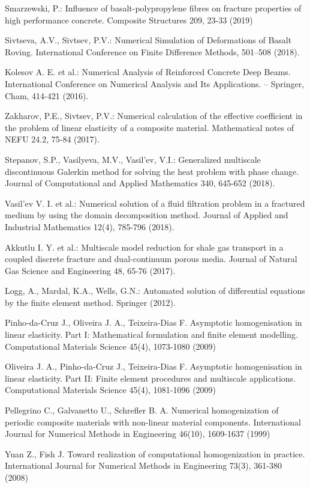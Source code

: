 \documentclass[a4paper]{jpconf}
\begin{document}
\begin{thebibliography}{}

Smarzewski, P.:
Influence of basalt-polypropylene fibres on fracture properties of high performance concrete.
Composite Structures 209, 23-33 (2019)

Sivtseva, A.V.,  Sivtsev, P.V.:
Numerical Simulation of Deformations of Basalt Roving.
International Conference on Finite Difference Methods, 501--508 (2018).

Kolesov A. E. et al.:
Numerical Analysis of Reinforced Concrete Deep Beams.
International Conference on Numerical Analysis and Its Applications. – Springer, Cham, 414-421 (2016).

Zakharov, P.E., Sivtsev, P.V.:
Numerical calculation of the effective coefficient in the problem of linear elasticity of a composite material. 
Mathematical notes of NEFU 24.2, 75-84 (2017).

Stepanov, S.P., Vasilyeva, M.V., Vasil’ev, V.I.:
Generalized multiscale discontinuous Galerkin method for solving the heat problem with phase change.
Journal of Computational and Applied Mathematics 340, 645-652 (2018).

Vasil’ev V. I. et al.: 
Numerical solution of a fluid filtration problem in a fractured medium by using the domain decomposition method. 
Journal of Applied and Industrial Mathematics 12(4), 785-796 (2018).

Akkutlu I. Y. et al.: 
Multiscale model reduction for shale gas transport in a coupled discrete fracture and dual-continuum porous media. 
Journal of Natural Gas Science and Engineering 48, 65-76 (2017).

Logg, A., Mardal, K.A., Wells, G.N.:
Automated solution of differential equations by the finite element method.
Springer (2012).

Pinho-da-Cruz J., Oliveira J. A., Teixeira-Dias F. Asymptotic homogenisation in linear elasticity. Part I: Mathematical formulation and finite element modelling. Computational Materials Science 45(4), 1073-1080 (2009)

Oliveira J. A., Pinho-da-Cruz J., Teixeira-Dias F. Asymptotic homogenisation in linear elasticity. Part II: Finite element procedures and multiscale applications. Computational Materials Science 45(4), 1081-1096 (2009)

Pellegrino C., Galvanetto U., Schrefler B. A. Numerical homogenization of periodic composite materials with non-linear material components. International Journal for Numerical Methods in Engineering 46(10), 1609-1637 (1999)
    
Yuan Z., Fish J. Toward realization of computational homogenization in practice. International Journal for Numerical Methods in Engineering 73(3), 361-380 (2008)


\end{thebibliography}
\end{document}

